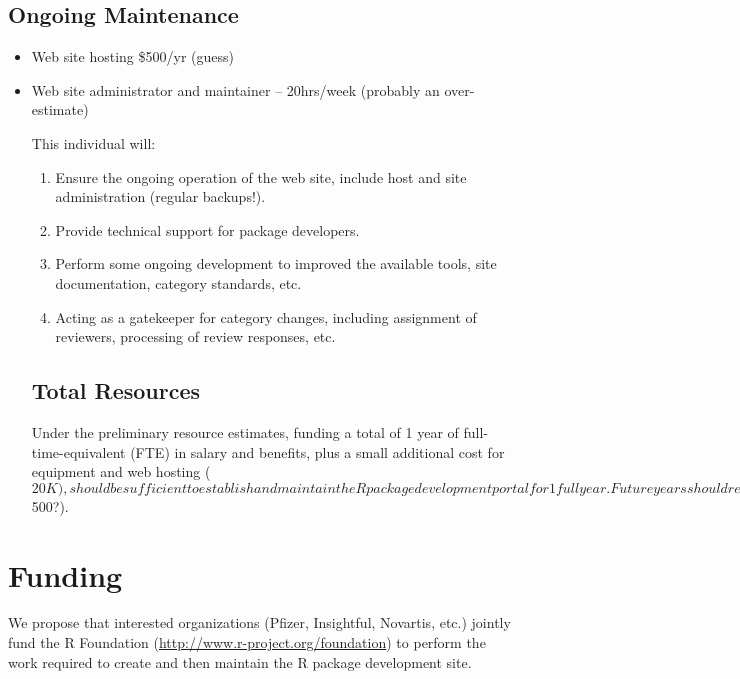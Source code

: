 \documentclass[12pt]{article}
\begin{document}
\subsection{Ongoing Maintenance}

\begin{itemize}

\item Web site hosting \$500/yr  (guess)

\item Web site administrator and maintainer -- 20hrs/week (probably an
  over-estimate)

  This individual will:

  \begin{enumerate}

  \item Ensure the ongoing operation of the web site, include host and
    site administration (regular backups!).

  \item Provide technical support for package developers.

  \item Perform some ongoing development to improved the available
    tools, site documentation, category standards, etc.

  \item Acting as a gatekeeper for category changes, including
    assignment of reviewers, processing of review responses, etc.

  \end{enumerate}


\subsection{Total Resources}

Under the preliminary resource estimates, funding a total of 1
year of full-time-equivalent (FTE) in salary and benefits, plus a
small additional cost for equipment and web hosting ($20K), should
be sufficient to establish and maintain the R package development
portal for 1 full year.  Future years should require only 1/2 FTE
plus web hosting costs (~$500?).

\end{itemize}

\section{Funding}


We propose that interested organizations (Pfizer, Insightful,
Novartis, etc.) jointly fund the R Foundation
(\url{http://www.r-project.org/foundation}) to perform the work
required to create and then maintain the R package development
site.
\end{document}
